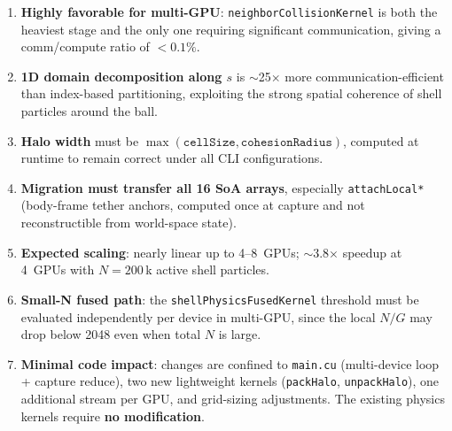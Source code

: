 \documentclass[conference]{IEEEtran}
\begin{document}
\begin{enumerate}
  \item \textbf{Highly favorable for multi-GPU}: \texttt{neighborCollisionKernel}
        is both the heaviest stage and the only one requiring significant
        communication, giving a comm/compute ratio of $< 0.1\%$.

  \item \textbf{1D domain decomposition along $s$} is $\sim$25$\times$ more
        communication-efficient than index-based partitioning, exploiting the
        strong spatial coherence of shell particles around the ball.

  \item \textbf{Halo width} must be $\max(\texttt{cellSize},
        \texttt{cohesionRadius})$, computed at runtime to remain correct under
        all CLI configurations.

  \item \textbf{Migration must transfer all 16 SoA arrays}, especially
        \texttt{attachLocal*} (body-frame tether anchors, computed once at
        capture and not reconstructible from world-space state).

  \item \textbf{Expected scaling}: nearly linear up to 4--8~GPUs;
        $\sim$3.8$\times$ speedup at 4~GPUs with $N = 200$\,k active shell
        particles.

  \item \textbf{Small-N fused path}: the \texttt{shellPhysicsFusedKernel}
        threshold must be evaluated independently per device in multi-GPU,
        since the local $N/G$ may drop below 2048 even when total $N$ is
        large.

  \item \textbf{Minimal code impact}: changes are confined to \texttt{main.cu}
        (multi-device loop + capture reduce), two new lightweight kernels
        (\texttt{packHalo}, \texttt{unpackHalo}), one additional stream per
        GPU, and grid-sizing adjustments. The existing physics kernels require
        \textbf{no modification}.
\end{enumerate}
\end{document}

